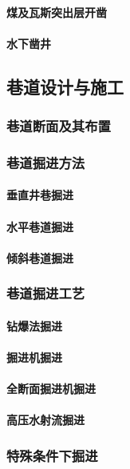 \documentclass[UTF8]{../../ApplicationUniverse}
\begin{document}
            \paragraph{煤及瓦斯突出层开凿}
            \paragraph{水下凿井}
    \subsection{巷道设计与施工}
        \subsubsection{巷道断面及其布置}
        \subsubsection{巷道掘进方法}
            \paragraph{垂直井巷掘进}
            \paragraph{水平巷道掘进}
            \paragraph{倾斜巷道掘进}
        \subsubsection{巷道掘进工艺}
            \paragraph{钻爆法掘进}
            \paragraph{掘进机掘进}
            \paragraph{全断面掘进机掘进}
            \paragraph{高压水射流掘进}
        \subsubsection{特殊条件下掘进}
\end{document}
